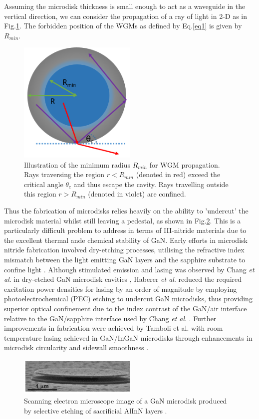 Assuming the microdisk thickness is small enough to act as a waveguide in the vertical direction, we can consider the propagation of a ray of light in 2-D as in Fig.\ref{1.14}. The forbidden position of the WGMs as defined by Eq.\ref{eq1} is given by $R_{min}$.
\begin{figure}[h]
	\centering
	\includegraphics[width=0.5\textwidth]{Figs/Ch1/mdiskray.png}
	\caption {Illustration of the minimum radius $R_{min}$ for WGM propagation. Rays traversing the region $r<R_{min}$ (denoted in red) exceed the critical angle $\theta_{c}$ and thus escape the cavity. Rays travelling outside this region $r>R_{min}$ (denoted in violet) are confined.  }
	\label{1.14}
\end{figure}
\FloatBarrier 
Thus the fabrication of microdisks relies heavily on the ability to 'undercut' the microdisk material whilst still leaving a pedestal, as shown in Fig.\ref{1.15}. This is a particularly difficult problem to address in terms of III-nitride materials due to the excellent thermal ande chemical stability of GaN.  Early efforts in microdisk nitride fabrication involved dry-etching processes, utilising the refractive index mismatch between the light emitting GaN layers and the sapphire substrate to confine light \cite{Tamboli2007}. Although stimulated emission and lasing was observed by Chang {\it et al}. in dry-etched GaN microdisk cavities \cite{Chang1999}, Haberer {\it et al}. \cite{Haberer2004} reduced the required excitation power densities for lasing by an order of magnitude by employing photoelectrochemical (PEC) etching to undercut GaN microdisks, thus providing superior optical confinement due to the index contrast of the GaN/air interface  relative to the GaN/sapphire interface used by Chang {\it et al}. \cite{Chang1999}. Further improvements in fabrication were achieved by Tamboli et al. with room temperature lasing achieved in GaN/InGaN microdisks through enhancements in microdisk circularity and sidewall smoothness \cite{Tamboli2007}. 
\begin{figure}[h]
	\centering
	\includegraphics[width=0.5\textwidth]{Figs/Ch1/mdisksem.png}
	\caption {Scanning electron microscope image of a GaN microdisk produced by selective etching of sacrificial AlInN layers \cite{Simeonov2008}.}
	\label{1.15}
\end{figure}
\FloatBarrier 


